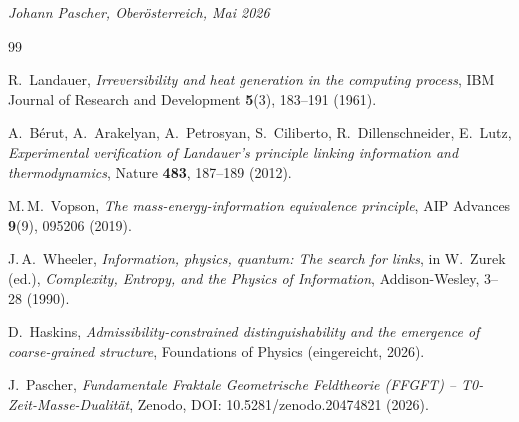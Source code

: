 \bigskip
\begin{flushright}
\textit{Johann Pascher, Oberösterreich, Mai 2026}
\end{flushright}

\begin{thebibliography}{99}

R.~Landauer,
\textit{Irreversibility and heat generation in the computing process},
IBM Journal of Research and Development \textbf{5}(3), 183--191 (1961).

A.~Bérut, A.~Arakelyan, A.~Petrosyan, S.~Ciliberto,
R.~Dillenschneider, E.~Lutz,
\textit{Experimental verification of Landauer's principle linking
information and thermodynamics},
Nature \textbf{483}, 187--189 (2012).

M.\,M.~Vopson,
\textit{The mass-energy-information equivalence principle},
AIP Advances \textbf{9}(9), 095206 (2019).

J.\,A.~Wheeler,
\textit{Information, physics, quantum: The search for links},
in W.~Zurek (ed.), \textit{Complexity, Entropy, and the Physics
of Information}, Addison-Wesley, 3--28 (1990).

D.~Haskins,
\textit{Admissibility-constrained distinguishability and the emergence
of coarse-grained structure},
Foundations of Physics (eingereicht, 2026).

J.~Pascher,
\textit{Fundamentale Fraktale Geometrische Feldtheorie (FFGFT) --
T0-Zeit-Masse-Dualität},
Zenodo, DOI: 10.5281/zenodo.20474821 (2026).

\end{thebibliography}
